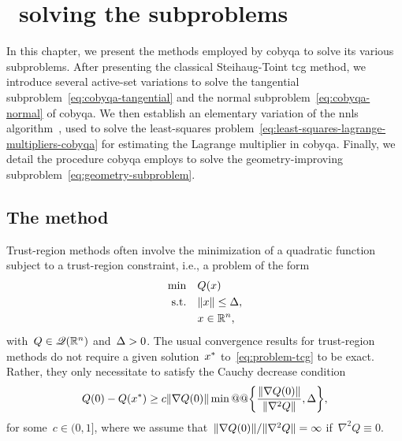 %
%
%
\chapter{ \textemdash\ solving the subproblems}
\label{ch:cobyqa-subproblems}

In this chapter, we present the methods employed by \gls{cobyqa} to solve its various subproblems.
After presenting the classical Steihaug-Toint \gls{tcg} method, we introduce several active-set variations to solve the tangential subproblem~\cref{eq:cobyqa-tangential} and the normal subproblem~\cref{eq:cobyqa-normal} of \gls{cobyqa}.
We then establish an elementary variation of the \gls{nnls} algorithm~\cite[Alg.~(23.10)]{Lawson_Hanson_1987}, used to solve the least-squares problem~\cref{eq:least-squares-lagrange-multipliers-cobyqa} for estimating the Lagrange multiplier in \gls{cobyqa}.
Finally, we detail the procedure \gls{cobyqa} employs to solve the geometry-improving subproblem~\cref{eq:geometry-subproblem}.

\section{The  method}

Trust-region methods often involve the minimization of a quadratic function subject to a trust-region constraint, i.e., a problem of the form
\begin{subequations}
    \label{eq:problem-tcg}
    \begin{align}
        \min        & \quad Q(\iter)\\
        \text{s.t.} & \quad \norm{\iter} \le \rad,\\
                    & \quad \iter \in \R^n, \nonumber
    \end{align}
\end{subequations}
with~$Q \in \mathscr{Q}(\mathbb{R}^n)$ and~$\rad > 0$.
The usual convergence results for trust-region methods do not require a given solution~$\iter[\ast]$ to~\cref{eq:problem-tcg} to be exact.
Rather, they only necessitate to satisfy the Cauchy decrease condition
\begin{equation*}
    Q(0) - Q(\iter[\ast]) \ge c \norm{\nabla Q(0)} \min @@ \set[\bigg]{\frac{\norm{\nabla Q(0)}}{\norm{\nabla^2 Q}}, \rad},
\end{equation*}
for some~$c \in (0, 1]$, where we assume that~$\lVert\nabla Q(0)\rVert / \lVert\nabla^2 Q\rVert = \infty$ if~$\nabla^2 Q \equiv 0$.

